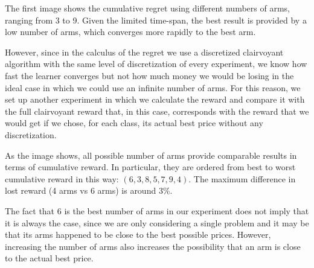 The first image shows the cumulative regret using different numbers of arms, ranging from 3 to 9.
Given the limited time-span, the best result is provided by a low number of arms, which converges more rapidly to the best arm.

However, since in the calculus of the regret we use a discretized clairvoyant algorithm with the same level of discretization of every experiment, we know how fast the learner converges but not how much money we would be losing in the ideal case in which we could use an infinite number of arms. For this reason, we set up another experiment in which we calculate the reward and compare it with the full clairvoyant reward that, in this case, corresponds with the reward that we would get if we chose, for each class, its actual best price without any discretization.

As the image shows, all possible number of arms provide comparable results in terms of cumulative reward. In particular, they are ordered from best to worst cumulative reward in this way: $(6,3,8,5,7,9,4)$. The maximum difference in lost reward (4 arms vs 6 arms) is around 3\%.

The fact that 6 is the best number of arms in our experiment does not imply that it is always the case, since we are only considering a single problem and it may be that its arms happened to be close to the best possible prices.
However, increasing the number of arms also increases the possibility that an arm is close to the actual best price.